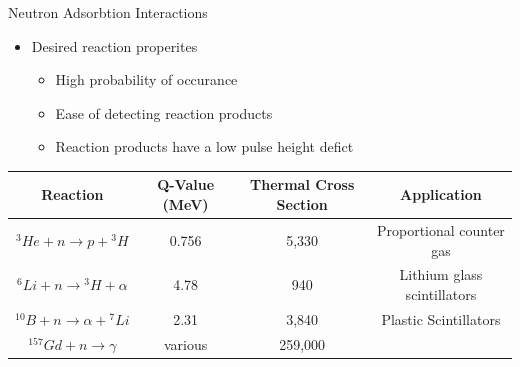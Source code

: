 \begin{frame}{Neutron Adsorbtion Interactions}
\begin{itemize}
	\item Desired reaction properites
	\begin{itemize}
		\item High probability of occurance
		\item Ease of detecting reaction products
		\item Reaction products have a low pulse height defict
	\end{itemize}
	\end{itemize}
	\begin{table}[h]
	\tiny
	\centering
	\begin{tabular}{c| c c c} 
		Reaction & Q-Value (MeV) & Thermal Cross Section & Application \\
		\hline
		\hline
		${}^3He + n \to p +{}^3H$ & 0.756 & 5,330 & Proportional counter gas \\
		${}^6Li + n \to {}^3H + \alpha$ & 4.78 & 940 & Lithium glass scintillators \\
		${}^{10}B + n \to \alpha + {}^7Li$ & 2.31 & 3,840 & Plastic Scintillators \\
		${}^{157}Gd + n \to \gamma$  &various &259,000 \\
	\end{tabular}
	\end{table}
\end{frame}

